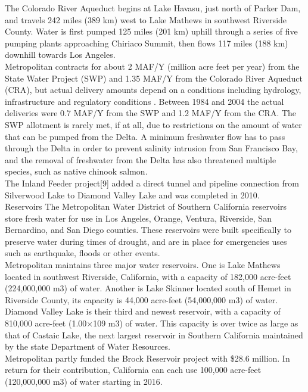 \documentclass{article}
\begin{document}
The Colorado River Aqueduct begins at Lake Havasu, just north of Parker Dam, and travels 242 miles (389 km) west to Lake Mathews in southwest Riverside County. Water is first pumped 125 miles (201 km) uphill through a series of five pumping plants approaching Chiriaco Summit, then flows 117 miles (188 km) downhill towards Los Angeles.\\

Metropolitan contracts for about 2 MAF/Y (million acre feet per year) from the State Water Project (SWP) and 1.35 MAF/Y from the Colorado River Aqueduct (CRA), but actual delivery amounts depend on a conditions including hydrology, infrastructure and regulatory conditions . Between 1984 and 2004 the actual deliveries were 0.7 MAF/Y from the SWP and 1.2 MAF/Y from the CRA. The SWP allotment is rarely met, if at all, due to restrictions on the amount of water that can be pumped from the Delta. A minimum freshwater flow has to pass through the Delta in order to prevent salinity intrusion from San Francisco Bay, and the removal of freshwater from the Delta has also threatened multiple species, such as native chinook salmon.\\

The Inland Feeder project[9] added a direct tunnel and pipeline connection from Silverwood Lake to Diamond Valley Lake and was completed in 2010.\\

Reservoirs
The Metropolitan Water District of Southern California reservoirs store fresh water for use in Los Angeles, Orange, Ventura, Riverside, San Bernardino, and San Diego counties. These reservoirs were built specifically to preserve water during times of drought, and are in place for emergencies uses such as earthquake, floods or other events.\\

Metropolitan maintains three major water reservoirs. One is Lake Mathews located in southwest Riverside, California, with a capacity of 182,000 acre-feet (224,000,000 m3) of water. Another is Lake Skinner located south of Hemet in Riverside County, its capacity is 44,000 acre-feet (54,000,000 m3) of water. Diamond Valley Lake is their third and newest reservoir, with a capacity of 810,000 acre-feet (1.00×109 m3) of water. This capacity is over twice as large as that of Castaic Lake, the next largest reservoir in Southern California maintained by the state Department of Water Resources.\\

Metropolitan partly funded the Brock Reservoir project with \$28.6 million. In return for their contribution, California can each use 100,000 acre-feet (120,000,000 m3) of water starting in 2016.\\
\end{document}
